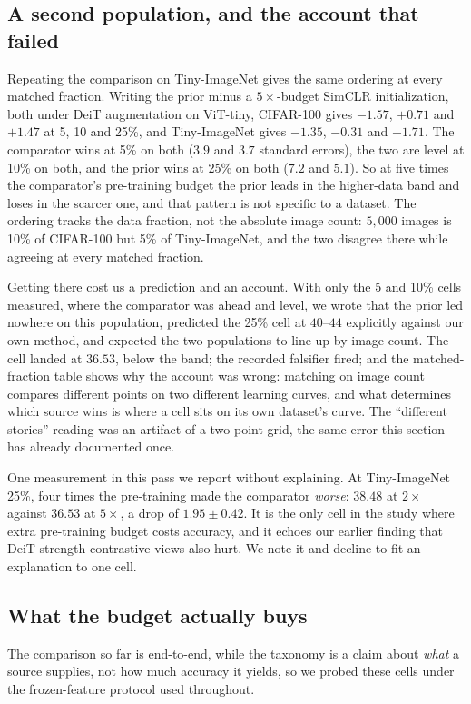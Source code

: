 \subsection{A second population, and the account that
failed}\label{sec:budget:tin} Repeating the comparison on Tiny-ImageNet gives
the same ordering at every matched fraction. Writing the prior minus a
$5\times$-budget SimCLR initialization, both under DeiT augmentation on
ViT-tiny, CIFAR-100 gives $-1.57$, $+0.71$ and $+1.47$ at 5, 10 and 25\%, and
Tiny-ImageNet gives $-1.35$, $-0.31$ and $+1.71$. The comparator wins at 5\% on
both ($3.9$ and $3.7$ standard errors), the two are level at 10\% on both, and
the prior wins at 25\% on both ($7.2$ and $5.1$). So at five times the
comparator's pre-training budget the prior leads in the higher-data band and
loses in the scarcer one, and that pattern is not specific to a dataset. The
ordering tracks the data fraction, not the absolute image count: $5{,}000$
images is 10\% of CIFAR-100 but 5\% of Tiny-ImageNet, and the two disagree
there while agreeing at every matched fraction.

Getting there cost us a prediction and an account. With only the 5 and 10\%
cells measured, where the comparator was ahead and level, we wrote that the
prior led nowhere on this population, predicted the 25\% cell at $40$--$44$
explicitly against our own method, and expected the two populations to line
up by image count. The cell landed at $36.53$, below the band; the recorded
falsifier fired; and the matched-fraction table shows why the account was
wrong: matching on image count compares different points on two different
learning curves, and what determines which source wins is where a cell sits
on its own dataset's curve. The ``different stories'' reading was an
artifact of a two-point grid, the same error this section has already
documented once.

One measurement in this pass we report without explaining. At Tiny-ImageNet
25\%, four times the pre-training made the comparator \emph{worse}: $38.48$ at
$2\times$ against $36.53$ at $5\times$, a drop of $1.95 \pm 0.42$. It is the
only cell in the study where extra pre-training budget costs accuracy, and it
echoes our earlier finding that DeiT-strength contrastive views also hurt. We
note it and decline to fit an explanation to one cell.

\subsection{What the budget actually buys}\label{sec:budget:features}
The comparison so far is end-to-end, while the taxonomy is a claim about
\emph{what} a source supplies, not how much accuracy it yields, so we
probed these cells under the frozen-feature protocol used throughout.


